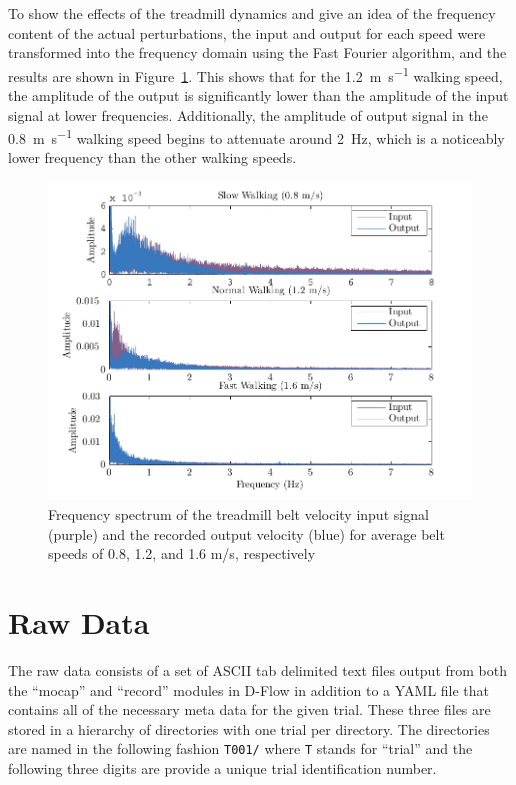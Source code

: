 \documentclass[fleqn,10pt]{wlpeerj}
\begin{document}
To show the effects of the treadmill dynamics and give an idea of the frequency
content of the actual perturbations, the input and output for each speed were
transformed into the frequency domain using the Fast Fourier algorithm, and the
results are shown in Figure~\ref{fig:freq_analysis}. This shows that for the
1.2~\si{\meter\per\second} walking speed, the amplitude of the output is
significantly lower than the amplitude of the input signal at lower
frequencies. Additionally, the amplitude of output signal in the
0.8~\si{\meter\per\second}  walking speed begins to attenuate around
2~\si{\hertz}, which is a noticeably lower frequency than the other walking
speeds.
%
\begin{figure}
  \centering
  \includegraphics{figures/frequency_analysis.pdf}
  \caption{Frequency spectrum of the treadmill belt velocity input signal
    (purple) and the recorded output velocity (blue) for average belt speeds of
    0.8, 1.2, and 1.6 m/s, respectively}
  \label{fig:freq_analysis}
\end{figure}

\section*{Raw Data}
%
The raw data consists of a set of ASCII tab delimited text files output from
both the ``mocap'' and ``record'' modules in D-Flow in addition to a YAML file
that contains all of the necessary meta data for the given trial. These three
files are stored in a hierarchy of directories with one trial per directory.
The directories are named in the following fashion \verb+T001/+ where \verb+T+
stands for ``trial'' and the following three digits are provide a unique trial
identification number.
\end{document}
